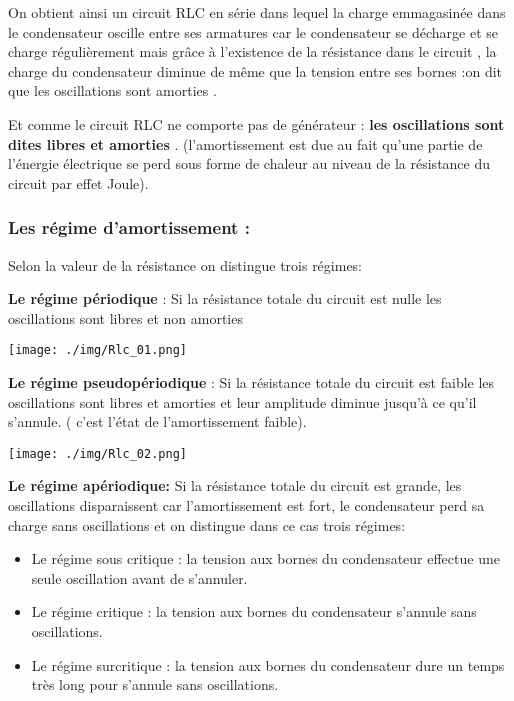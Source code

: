 \documentclass[12pt]{article}
\begin{document}
On obtient ainsi un circuit RLC en série dans lequel la charge emmagasinée dans le condensateur oscille entre ses armatures car le
condensateur se décharge et se charge régulièrement mais grâce à l'existence de la résistance dans le circuit , la charge du
condensateur diminue de même que la tension entre ses bornes :on dit que les oscillations sont amorties .

Et comme le circuit RLC ne comporte pas de générateur : \textbf{les oscillations sont dites libres et amorties }.
(l'amortissement est due au fait qu'une partie de l'énergie électrique se perd sous forme de chaleur au niveau de la résistance
du circuit par effet Joule).
\subsubsection{Les régime d'amortissement : }
Selon la valeur de la résistance on distingue trois régimes:



\textbf{Le régime périodique }: Si la résistance totale du circuit est nulle les oscillations sont libres et non amorties

\begin{center}
	\texttt{[image: ./img/Rlc\_01.png]}
\end{center}

\textbf{Le régime pseudopériodique } : Si la résistance totale du circuit est faible les oscillations sont libres et amorties et leur
amplitude diminue jusqu'à ce qu'il s'annule. ( c'est l'état de l'amortissement faible).

\begin{center}
	\texttt{[image: ./img/Rlc\_02.png]}
\end{center}


\textbf{Le régime apériodique: }Si la résistance totale du circuit est grande, les oscillations disparaissent car l'amortissement est
fort, le condensateur perd sa charge sans oscillations et on distingue dans ce cas trois régimes:

\begin{itemize}
	\item Le régime sous critique : la tension aux bornes du condensateur effectue une seule oscillation avant de s'annuler.

	\item Le régime critique : la tension aux bornes du condensateur s'annule sans oscillations.
	\item Le régime surcritique : la tension aux bornes du condensateur dure un temps très long pour s'annule sans oscillations.
\end{itemize}
\end{document}
